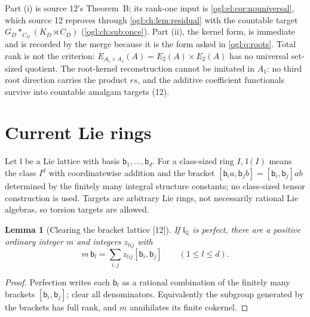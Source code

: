 \documentclass[11pt,oneside]{article}
\numberwithin{equation}{section}
\newtheorem{lemma}[lemma]{Lemma}
\theoremstyle{definition}
\theoremstyle{remark}
\newcommand{\Q}{\mathbb Q}
\newcommand{\src}[1]{\textup{\textsf{\small[#1]}}}
\begin{document}
Part (i) is source 12's Theorem~B; its rank-one input is
\cref{ogl:el:cor:nouniversal}, which source 12 reproves through
\cref{ogl:ch:lem:residual} with the countable target $G_D*_{C_D}(K_D\rtimes C_D)$
(\cref{ogl:ch:sub:once}). Part (ii), the kernel form, is immediate and is recorded
by the merge because it is the form asked in \cref{ogl:q:roots}. Total rank is
not the criterion: $E_{A_1\times A_1}(A)=E_2(A)\times E_2(A)$ has no universal
set-sized quotient. The root-kernel reconstruction cannot be imitated in $A_1$:
no third root direction carries the product $rs$, and the additive coefficient
functionals survive into countable amalgam targets (12).

\section{Current Lie rings}\label{ogl:ch:sec:lie}

Let $\mathfrak l$ be a Lie lattice with basis $\mathsf b_1,\dots,\mathsf b_d$. For
a class-sized ring $I$, $\mathfrak l(I)$ means the class $I^d$ with coordinatewise
addition and the bracket
$[\mathsf b_ia,\mathsf b_jb]=[\mathsf b_i,\mathsf b_j]ab$ determined by the finitely
many integral structure constants; no class-sized tensor construction is used.
Targets are arbitrary Lie rings, not necessarily rational Lie algebras, so
torsion targets are allowed.

\begin{lemma}[Clearing the bracket lattice \src{12}]\label{ogl:ch:lem:bracketlattice}
If $\mathfrak l_\Q$ is perfect, there are a positive ordinary integer $m$ and
integers $z_{lij}$ with
\begin{equation}\label{ogl:ch:eq:bracketlattice}
 m\,\mathsf b_l=\sum_{i,j}z_{lij}[\mathsf b_i,\mathsf b_j]\qquad(1\le l\le d).
\end{equation}
\end{lemma}
\begin{proof}
Perfection writes each $\mathsf b_l$ as a rational combination of the finitely many
brackets $[\mathsf b_i,\mathsf b_j]$; clear all denominators. Equivalently the
subgroup generated by the brackets has full rank, and $m$ annihilates its
finite cokernel.
\end{proof}
\end{document}
